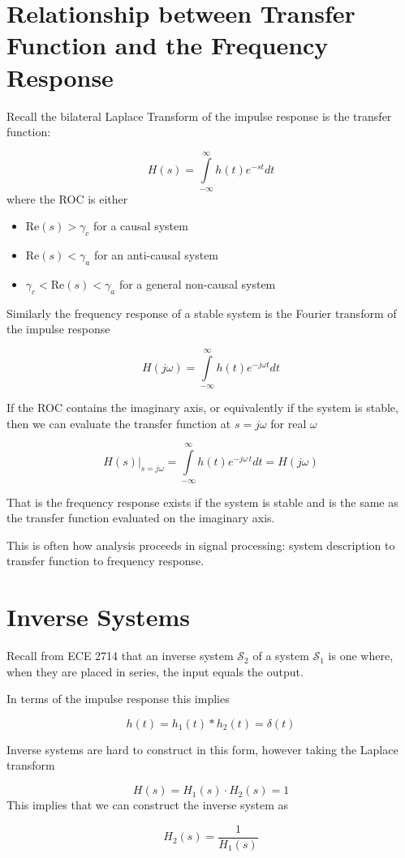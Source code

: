 \documentclass{article}
\begin{document}
\section{Relationship between Transfer Function and the Frequency Response}

Recall the bilateral Laplace Transform of the impulse response is the transfer function:

$$
H(s) = \int\limits_{-\infty}^{\infty} h(t) e^{-st} dt
$$
where the ROC is either

\begin{itemize}
\item $\text{Re}(s) > \gamma_c$ for a causal system
\item $\text{Re}(s) < \gamma_a$ for an anti-causal system
\item $\gamma_c < \text{Re}(s) < \gamma_a$ for a general non-causal system 
\end{itemize}

Similarly the frequency response of a stable system is the Fourier transform of the impulse response

$$
H(j\omega) = \int\limits_{-\infty}^{\infty} h(t) e^{-j\omega t} dt
$$

If the ROC contains the imaginary axis, or equivalently if the system is stable, then we can evaluate the transfer function at $s = j\omega$ for real $\omega$

$$
\left. H(s) \right|_{s = j\omega} = \int\limits_{-\infty}^{\infty} h(t) e^{-j\omega\, t} dt = H(j\omega)
$$

That is the frequency response exists if the system is stable and is the same as the transfer function evaluated on the imaginary axis.

This is often how analysis proceeds in signal processing: system description to transfer function to frequency response.

\section{Inverse Systems}

Recall from ECE 2714 that an inverse system $\mathcal{S}_2$ of a system $\mathcal{S}_1$ is one where, when they are placed in series, the input equals the output.

In terms of the impulse response this implies

$$
h(t) = h_1(t) * h_2(t) = \delta(t)
$$

Inverse systems are hard to construct in this form, however taking the Laplace transform

$$
H(s) = H_1(s)\cdot H_2(s) = 1
$$
This implies that we can construct the inverse system as

$$
H_2(s) = \frac{1}{H_1(s)}
$$
\end{document}
